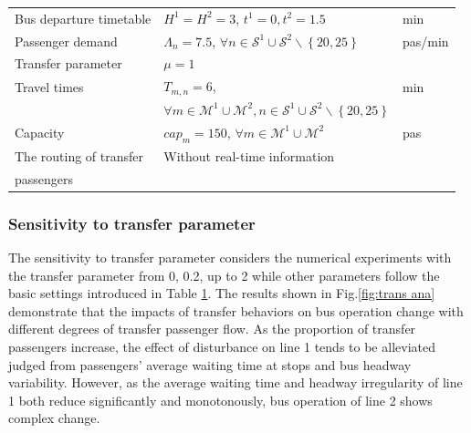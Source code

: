 \documentclass[smallextended]{svjour3}       %
\begin{document}
\begin{Abstract}
\begin{table}[H]
\begin{tabular}{p{3.4cm}p{6.5cm}p{1.1cm}}
      Bus departure timetable & $H^{1}=H^{2}=3$, $t^{1}=0,t^{2}=1.5$ & min       \\
      Passenger demand &$\Lambda_{n}=7.5$, $\forall n\in \mathcal{S}^{1}\cup\mathcal{S}^{2}\backslash\left\{20,25\right\}$&pas/min\\
      Transfer parameter & $\mu=1$&  \\
      Travel times & $T_{m,n}=6$,                            & min \\
                   &$\forall m\in\mathcal{M}^{1}\cup \mathcal{M}^{2},n\in \mathcal{S}^{1}\cup\mathcal{S}^{2}\backslash \left\{20,25\right\}$\\
      Capacity & $cap_m=150$, $\forall m\in\mathcal{M}^{1}\cup \mathcal{M}^{2}$&pas \\
      The routing of transfer & Without real-time information\\
      passengers
      &\\ \hline
  \end{tabular}
  \label{tab: basic settings}
\end{table}

\subsubsection{Sensitivity to transfer parameter}
The sensitivity to transfer parameter considers the numerical experiments with the transfer parameter from 0, 0.2, up to 2 
while other parameters follow the basic settings introduced in Table \ref{tab: basic settings}. 
The results shown in Fig.\ref{fig:trans ana} demonstrate that the impacts of transfer behaviors on bus operation change with different degrees of transfer passenger flow. 
As the proportion of transfer passengers increase, the effect of disturbance on line 1 tends to be alleviated judged from passengers' average waiting time at stops and bus headway variability.
However, as the average waiting time and headway irregularity of line 1 both reduce significantly and monotonously, 
bus operation of line 2 shows complex change. 


\end{Abstract}
\end{document}
